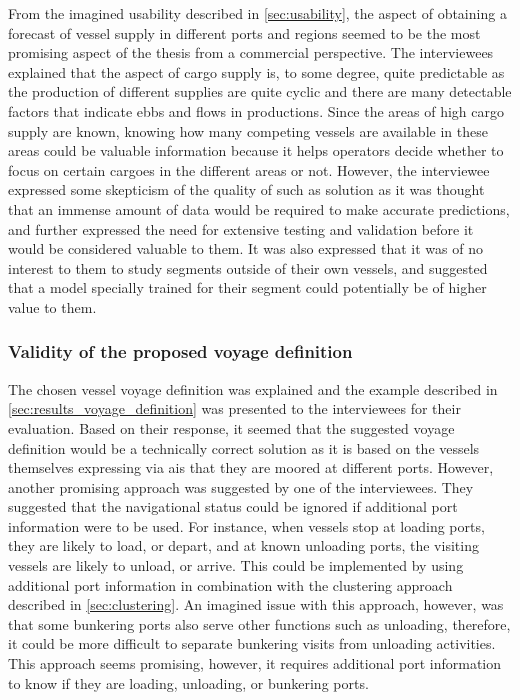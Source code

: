 From the imagined usability described in \cref{sec:usability}, the aspect of obtaining a forecast of vessel supply in different ports and regions seemed to be the most promising aspect of the thesis from a commercial perspective. The interviewees explained that the aspect of cargo supply is, to some degree, quite predictable as the production of different supplies are quite cyclic and there are many detectable factors that indicate ebbs and flows in productions. Since the areas of high cargo supply are known, knowing how many competing vessels are available in these areas could be valuable information because it helps operators decide whether to focus on certain cargoes in the different areas or not. However, the interviewee expressed some skepticism of the quality of such as solution as it was thought that an immense amount of data would be required to make accurate predictions, and further expressed the need for extensive testing and validation before it would be considered valuable to them. It was also expressed that it was of no interest to them to study segments outside of their own vessels, and suggested that a model specially trained for their segment could potentially be of higher value to them.

\subsubsection{Validity of the proposed voyage definition}

The chosen vessel voyage definition was explained and the example described in \cref{sec:results_voyage_definition} was presented to the interviewees for their evaluation. Based on their response, it seemed that the suggested voyage definition would be a technically correct solution as it is based on the vessels themselves expressing via \acrshort{ais} that they are moored at different ports. However, another promising approach was suggested by one of the interviewees. They suggested that the navigational status could be ignored if additional port information were to be used. For instance, when vessels stop at loading ports, they are likely to load, or depart, and at known unloading ports, the visiting vessels are likely to unload, or arrive. This could be implemented by using additional port information in combination with the clustering approach described in \cref{sec:clustering}. An imagined issue with this approach, however, was that some bunkering ports also serve other functions such as unloading, therefore, it could be more difficult to separate bunkering visits from unloading activities. This approach seems promising, however, it requires additional port information to know if they are loading, unloading, or bunkering ports.


